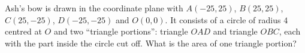 Ash's bow is drawn in the coordinate plane with $A(-25,25)$, $B(25,25)$, $C(25,-25)$, $D(-25,-25)$ and $O(0,0)$. It consists of a circle of radius $4$ centred at $O$ and two ``triangle portions'': triangle $OAD$ and triangle $OBC$, each with the part inside the circle cut off. What is the area of one triangle portion?
